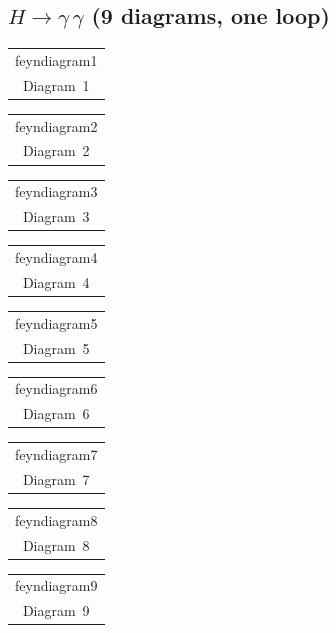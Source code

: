 \documentclass[a4paper,11pt]{article}
\makeatletter
\newcommand{\FeynDiagram}[1]{\csname feyndiagram#1\endcsname}
\newcommand{\FeynCell}[1]{\begin{tabular}[t]{@{}c@{}}\FeynDiagram{#1}\\[1ex]\small Diagram~#1\end{tabular}}
\makeatother
\begin{document}
\setlength{\parindent}{0pt}
\subsection*{$H \to \gamma\,\gamma$ \normalfont(9 diagrams, one loop)}
\noindent \FeynCell{1}\hfill \FeynCell{2}\hfill \FeynCell{3}\par\bigskip
\noindent \FeynCell{4}\hfill \FeynCell{5}\hfill \FeynCell{6}\par\bigskip
\noindent \FeynCell{7}\hfill \FeynCell{8}\hfill \FeynCell{9}\par\bigskip
\end{document}
